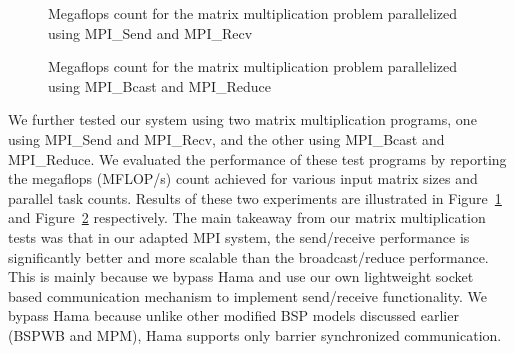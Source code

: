 \documentclass[conference,10pt] {IEEEtran}
\begin{document}
\begin{figure}[t]
  \centering
  \caption{Megaflops count for the matrix multiplication problem parallelized using MPI\_Send and MPI\_Recv}
  \label{fig-mm1}
\end{figure}

\begin{figure}[t]
  \centering
  \caption{Megaflops count for the matrix multiplication problem parallelized using MPI\_Bcast and MPI\_Reduce}
  \label{fig-mm2}
\end{figure}

We further tested our system using two matrix multiplication programs, one
using MPI\_Send and MPI\_Recv, and the other using MPI\_Bcast and MPI\_Reduce.
We evaluated the performance of these test programs by reporting the megaflops
(MFLOP/s) count achieved for various input matrix sizes and parallel task
counts. Results of these two experiments are illustrated in
Figure~\ref{fig-mm1} and Figure~\ref{fig-mm2} respectively. The main takeaway
from our matrix multiplication tests was that in our adapted MPI system, the
send/receive performance is significantly better and more scalable than the
broadcast/reduce performance. This is mainly because we bypass Hama and use our
own lightweight socket based communication mechanism to implement send/receive
functionality. We bypass Hama because unlike other modified BSP models
discussed earlier (BSPWB and MPM), Hama supports only barrier synchronized communication. 
\end{document}
